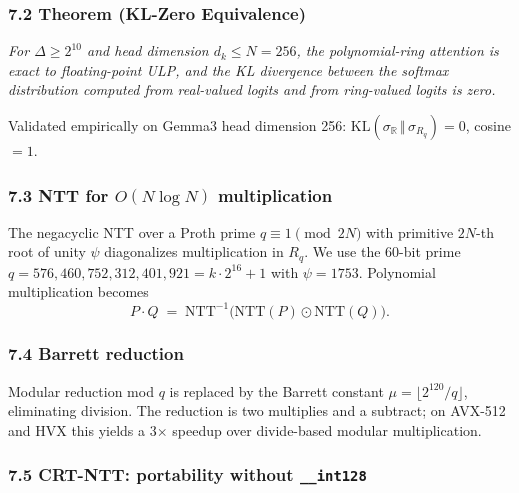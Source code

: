 \documentclass[
  11pt,
]{article}
\begin{document}
\hypertarget{theorem-kl-zero-equivalence}{%
\subsubsection{7.2 Theorem (KL-Zero
Equivalence)}\label{theorem-kl-zero-equivalence}}

\emph{For \(\Delta \ge 2^{10}\) and head dimension \(d_k \le N = 256\),
the polynomial-ring attention is exact to floating-point ULP, and the KL
divergence between the softmax distribution computed from real-valued
logits and from ring-valued logits is zero.}

Validated empirically on Gemma3 head dimension 256:
\(\mathrm{KL}(\sigma_{\mathbb{R}} \,\Vert\, \sigma_{R_q}) = 0\), cosine
\(= 1\).

\hypertarget{ntt-for-onlog-n-multiplication}{%
\subsubsection{\texorpdfstring{7.3 NTT for \(O(N\log N)\)
multiplication}{7.3 NTT for O(N\textbackslash log N) multiplication}}\label{ntt-for-onlog-n-multiplication}}

The negacyclic NTT over a Proth prime \(q \equiv 1 \pmod{2N}\) with
primitive \(2N\)-th root of unity \(\psi\) diagonalizes multiplication
in \(R_q\). We use the 60-bit prime
\(q = 576{,}460{,}752{,}312{,}401{,}921 = k \cdot 2^{16} + 1\) with
\(\psi = 1753\). Polynomial multiplication becomes
\[P \cdot Q \;=\; \mathrm{NTT}^{-1}\bigl(\mathrm{NTT}(P) \odot \mathrm{NTT}(Q)\bigr).\]

\hypertarget{barrett-reduction}{%
\subsubsection{7.4 Barrett reduction}\label{barrett-reduction}}

Modular reduction mod \(q\) is replaced by the Barrett constant
\(\mu = \lfloor 2^{120}/q\rfloor\), eliminating division. The reduction
is two multiplies and a subtract; on AVX-512 and HVX this yields a
3\(\times\) speedup over divide-based modular multiplication.

\hypertarget{crt-ntt-portability-without-__int128}{%
\subsubsection{\texorpdfstring{7.5 CRT-NTT: portability without
\texttt{\_\_int128}}{7.5 CRT-NTT: portability without \_\_int128}}\label{crt-ntt-portability-without-__int128}}
\end{document}

